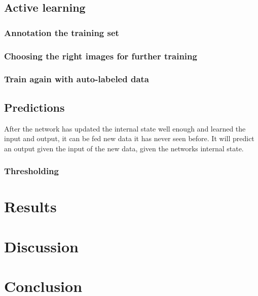 \documentclass[USenglish]{ifimaster}  %
\begin{document}
\section{Active learning}
\subsection{Annotation the training set}
\subsection{Choosing the right images for further training}
\subsection{Train again with auto-labeled data}
\section{Predictions}
After the network has updated the internal state well enough and learned the input and output, it can be fed new data it has never seen before. It will predict an output given the input of the new data, given the networks internal state.  
\subsection{Thresholding}

\chapter{Results}                     

\chapter{Discussion}

\chapter{Conclusion}



\backmatter{}
\printbibliography
\end{document}
